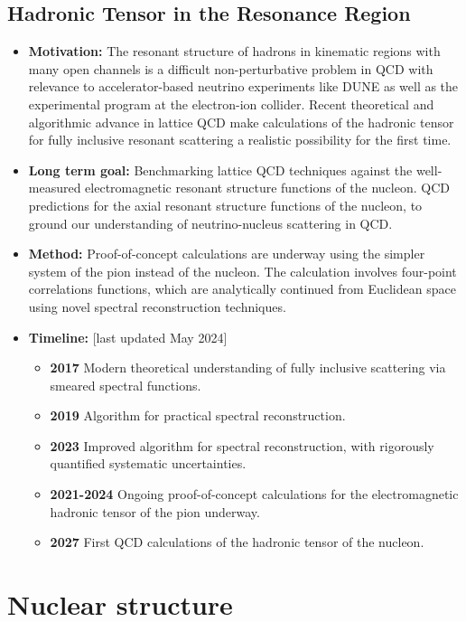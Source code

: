 \documentclass[12pt,hyperpdf]{article}
\begin{document}
\subsection{Hadronic Tensor in the Resonance Region}
\begin{itemize}
    \item{\bf Motivation:} The resonant structure of hadrons in kinematic regions with many open channels is a difficult non-perturbative problem in QCD with relevance to accelerator-based neutrino experiments like DUNE as well as the experimental program at the electron-ion collider.
    Recent theoretical and algorithmic advance in lattice QCD make calculations of the hadronic tensor for fully inclusive resonant scattering a realistic possibility for the first time.
    \item{\bf Long term goal:}
    Benchmarking lattice QCD techniques against the well-measured electromagnetic resonant structure functions of the nucleon.
    QCD predictions for the axial resonant structure functions of the nucleon, to ground our understanding of neutrino-nucleus scattering in QCD.
    \item{\bf Method:} Proof-of-concept calculations are underway using the simpler system of the pion instead of the nucleon.
	The calculation involves four-point correlations functions, which are analytically continued from Euclidean space using novel spectral reconstruction techniques.
\item{\bf Timeline:} \hfill [last updated May 2024]
\begin{itemize}
    \item{\bf 2017} Modern theoretical understanding of fully inclusive scattering via smeared spectral functions.~\cite{Hansen:2017mnd}
    \item{\bf 2019} Algorithm for practical spectral reconstruction.~\cite{Hansen:2019idp}
    \item{\bf 2023} Improved algorithm for spectral reconstruction, with rigorously quantified systematic uncertainties.
    \item{\bf 2021-2024} Ongoing proof-of-concept calculations for the electromagnetic hadronic tensor of the pion underway.
    \item{\bf 2027} First QCD calculations of the hadronic tensor of the nucleon.
\end{itemize}
\end{itemize}

\section{Nuclear structure}\label{sec:nucstruct}
\end{document}
